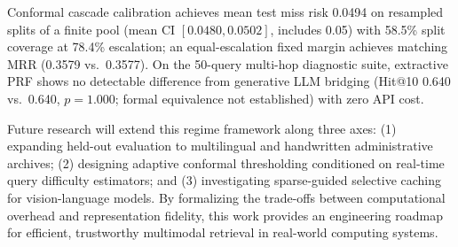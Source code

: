 \documentclass[conference]{IEEEtran}
\begin{document}
Conformal cascade calibration achieves mean test miss risk 0.0494 on resampled splits of a finite pool (mean CI $[0.0480, 0.0502]$, includes 0.05) with 58.5\% split coverage at 78.4\% escalation; an equal-escalation fixed margin achieves matching MRR (0.3579 vs.\ 0.3577). On the 50-query multi-hop diagnostic suite, extractive PRF shows no detectable difference from generative LLM bridging (Hit@10 0.640 vs.\ 0.640, $p=1.000$; formal equivalence not established) with zero API cost.

Future research will extend this regime framework along three axes: (1) expanding held-out evaluation to multilingual and handwritten administrative archives; (2) designing adaptive conformal thresholding conditioned on real-time query difficulty estimators; and (3) investigating sparse-guided selective caching for vision-language models. By formalizing the trade-offs between computational overhead and representation fidelity, this work provides an engineering roadmap for efficient, trustworthy multimodal retrieval in real-world computing systems.

\end{document}

